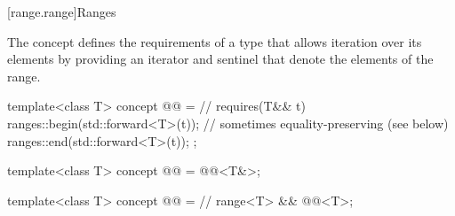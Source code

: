 [range.range]{Ranges}

\pnum
The  concept defines the requirements of a type that allows
iteration over its elements by providing an iterator and sentinel
that denote the elements of the range.

\begin{itemdecl}
template<class T>
  concept @@ =          // \expos
    requires(T&& t) {
      ranges::begin(std::forward<T>(t));        // sometimes equality-preserving (see below)
      ranges::end(std::forward<T>(t));
    };

template<class T>
  concept @@ = @@<T&>;

template<class T>
  concept @@ =    // \expos
    range<T> && @@<T>;
\end{itemdecl}


